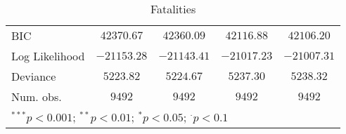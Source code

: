 \begin{sidewaystable}
\begin{center}
{\begin{tabular}{l c c c c}
BIC             & $42370.67$    & $42360.09$    & $42116.88$    & $42106.20$    \\
Log Likelihood  & $-21153.28$   & $-21143.41$   & $-21017.23$   & $-21007.31$   \\
Deviance        & $5223.82$     & $5224.67$     & $5237.30$     & $5238.32$     \\
Num. obs.       & $9492$        & $9492$        & $9492$        & $9492$        \\
\hline
\multicolumn{5}{l}{\scriptsize{$^{***}p<0.001$; $^{**}p<0.01$; $^{*}p<0.05$; $^{\cdot}p<0.1$}}
\end{tabular}
}
\caption{Fatalities}
\label{deaths}
\end{center}
\end{sidewaystable}
